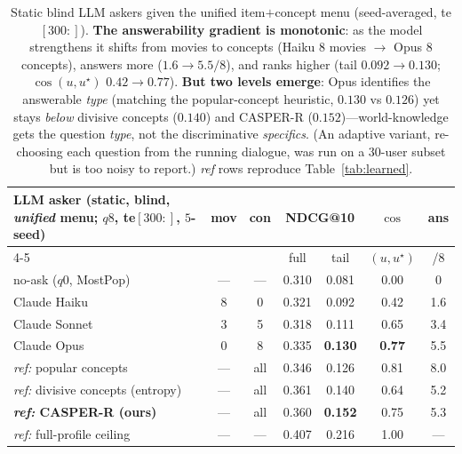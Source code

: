 \documentclass[11pt]{article}
\begin{document}
\begin{table}[h]\centering\small
\setlength{\tabcolsep}{5pt}
\begin{tabular}{l cc cc c c}
\toprule
LLM asker (static, blind, \emph{unified} menu; $q8$, te$[300{:}]$, $5$-seed) & mov & con & \multicolumn{2}{c}{NDCG@10} & $\cos$ & ans\\
\cmidrule(lr){4-5}
 & & & full & tail & $(u,u^\star)$ & /8\\
\midrule
no-ask ($q0$, MostPop) & --- & --- & 0.310 & 0.081 & 0.00 & 0\\
Claude Haiku  & 8 & 0 & 0.321 & 0.092 & 0.42 & 1.6\\
Claude Sonnet & 3 & 5 & 0.318 & 0.111 & 0.65 & 3.4\\
Claude Opus   & 0 & 8 & 0.335 & \textbf{0.130} & \textbf{0.77} & 5.5\\
\midrule
\emph{ref:} popular concepts & --- & all & 0.346 & 0.126 & 0.81 & 8.0\\
\emph{ref:} divisive concepts (entropy) & --- & all & 0.361 & 0.140 & 0.64 & 5.2\\
\textbf{\emph{ref:} CASPER-R (ours)} & --- & all & 0.360 & \textbf{0.152} & 0.75 & 5.3\\
\emph{ref:} full-profile ceiling & --- & --- & 0.407 & 0.216 & 1.00 & ---\\
\bottomrule
\end{tabular}
\caption{Static blind LLM askers given the unified item$+$concept menu (seed-averaged, te$[300{:}]$). \textbf{The
answerability gradient is monotonic}: as the model strengthens it shifts from movies to concepts (Haiku $8$ movies
$\to$ Opus $8$ concepts), answers more ($1.6\to5.5/8$), and ranks higher (tail $0.092\to0.130$; $\cos(u,u^\star)$
$0.42\to0.77$). \textbf{But two levels emerge}: Opus identifies the answerable \emph{type} (matching the popular-concept
heuristic, $0.130$ vs $0.126$) yet stays \emph{below} divisive concepts ($0.140$) and \mbox{CASPER-R}
($0.152$)---world-knowledge gets the question \emph{type}, not the discriminative \emph{specifics}. (An adaptive variant,
re-choosing each question from the running dialogue, was run on a $30$-user subset but is too noisy to report.)
\emph{ref} rows reproduce Table~\ref{tab:learned}.}
\label{tab:llm}
\end{table}
\end{document}
